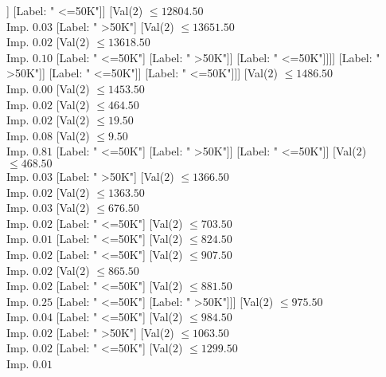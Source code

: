 \documentclass[margin=10pt]{standalone}
\begin{document}
\begin{forest}
												[Label: " >50K"]]
											[Label: " <=50K"]]
										[Val($2$) $ \leq 12804.50$ \\ Imp. $0.03$
											[Label: " >50K"]
											[Val($2$) $ \leq 13651.50$ \\ Imp. $0.02$
												[Val($2$) $ \leq 13618.50$ \\ Imp. $0.10$
													[Label: " <=50K"]
													[Label: " >50K"]]
												[Label: " <=50K"]]]]
									[Label: " >50K"]]
								[Label: " <=50K"]]
							[Label: " <=50K"]]]
					[Val($2$) $ \leq 1486.50$ \\ Imp. $0.00$
						[Val($2$) $ \leq 1453.50$ \\ Imp. $0.02$
							[Val($2$) $ \leq 464.50$ \\ Imp. $0.02$
								[Val($2$) $ \leq 19.50$ \\ Imp. $0.08$
									[Val($2$) $ \leq 9.50$ \\ Imp. $0.81$
										[Label: " <=50K"]
										[Label: " >50K"]]
									[Label: " <=50K"]]
								[Val($2$) $ \leq 468.50$ \\ Imp. $0.03$
									[Label: " >50K"]
									[Val($2$) $ \leq 1366.50$ \\ Imp. $0.02$
										[Val($2$) $ \leq 1363.50$ \\ Imp. $0.03$
											[Val($2$) $ \leq 676.50$ \\ Imp. $0.02$
												[Label: " <=50K"]
												[Val($2$) $ \leq 703.50$ \\ Imp. $0.01$
													[Label: " <=50K"]
													[Val($2$) $ \leq 824.50$ \\ Imp. $0.02$
														[Label: " <=50K"]
														[Val($2$) $ \leq 907.50$ \\ Imp. $0.02$
															[Val($2$) $ \leq 865.50$ \\ Imp. $0.02$
																[Label: " <=50K"]
																[Val($2$) $ \leq 881.50$ \\ Imp. $0.25$
																	[Label: " <=50K"]
																	[Label: " >50K"]]]
															[Val($2$) $ \leq 975.50$ \\ Imp. $0.04$
																[Label: " <=50K"]
																[Val($2$) $ \leq 984.50$ \\ Imp. $0.02$
																	[Label: " >50K"]
																	[Val($2$) $ \leq 1063.50$ \\ Imp. $0.02$
																		[Label: " <=50K"]
																		[Val($2$) $ \leq 1299.50$ \\ Imp. $0.01$

\end{forest}
\end{document}
